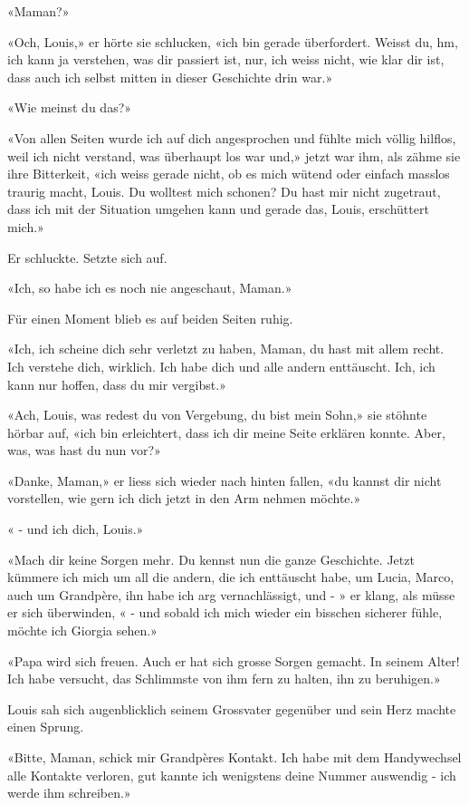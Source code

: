 «Maman?»

«Och, Louis,» er hörte sie schlucken, «ich bin gerade überfordert. Weisst
du, hm, ich kann ja verstehen, was dir passiert ist, nur, ich weiss nicht,
wie klar dir ist, dass auch ich selbst mitten in dieser Geschichte drin
war.»

«Wie meinst du das?»

«Von allen Seiten wurde ich auf dich angesprochen und fühlte mich völlig
hilflos, weil ich nicht verstand, was überhaupt los war und,» jetzt war
ihm, als zähme sie ihre Bitterkeit, «ich weiss gerade nicht, ob es mich
wütend oder einfach masslos traurig macht, Louis. Du wolltest mich
schonen? Du hast mir nicht zugetraut, dass ich mit der Situation umgehen
kann und gerade das, Louis, erschüttert mich.»

Er schluckte. Setzte sich auf. 

«Ich, so habe ich es noch nie angeschaut, Maman.»

Für einen Moment blieb es auf beiden Seiten ruhig.

«Ich, ich scheine dich sehr verletzt zu haben, Maman, du hast mit allem recht. Ich verstehe dich, wirklich. Ich habe dich und alle andern enttäuscht. Ich, ich kann nur hoffen, dass du mir vergibst.»

«Ach, Louis, was redest du von Vergebung, du bist mein Sohn,» sie stöhnte hörbar auf, 
«ich bin erleichtert, dass ich dir meine Seite erklären konnte. Aber, was, was hast du nun vor?»

«Danke, Maman,» er liess sich wieder nach hinten fallen, «du kannst dir nicht vorstellen, wie gern ich dich jetzt
in den Arm nehmen möchte.»

« - und ich dich, Louis.»

 «Mach dir keine Sorgen mehr. Du kennst nun die ganze
Geschichte. Jetzt kümmere ich mich um all die andern, die ich
enttäuscht habe, um Lucia, Marco, auch um Grandpère, ihn
habe ich arg vernachlässigt, und - » er klang, als müsse er sich
überwinden, « - und sobald ich mich wieder ein bisschen sicherer fühle,
möchte ich Giorgia sehen.»

«Papa wird sich freuen. Auch er hat sich grosse Sorgen gemacht. In
seinem Alter! Ich habe versucht, das Schlimmste von ihm fern zu halten,
ihn zu beruhigen.»

Louis sah sich augenblicklich seinem Grossvater gegenüber und sein Herz
machte einen Sprung.

«Bitte, Maman, schick mir Grandpères Kontakt. Ich habe mit dem Handywechsel alle Kontakte verloren, gut kannte ich wenigstens deine Nummer auswendig - ich werde ihm schreiben.»


